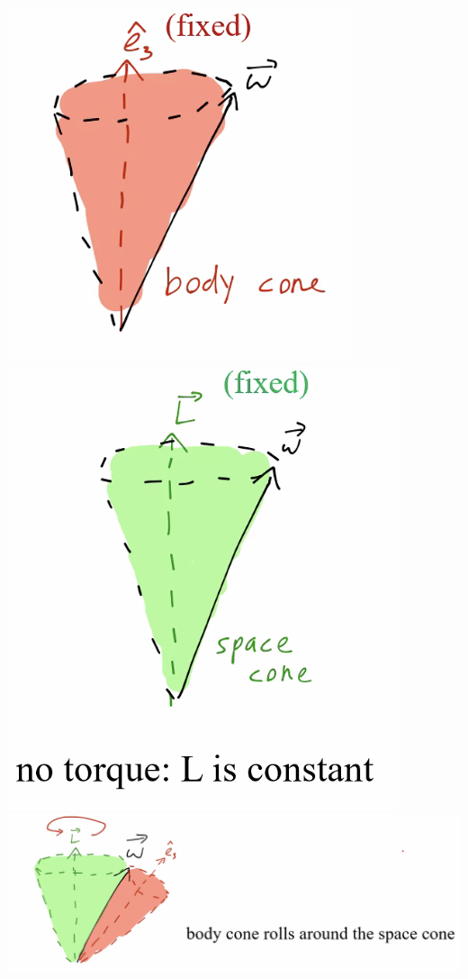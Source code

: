 \documentclass[../PHYS306Notes.tex]{subfiles}
\begin{document}
\begin{center}
    \includegraphics[scale=0.5]{Lecture-20/l20-img4.png}
    \includegraphics[scale=0.5]{Lecture-20/l20-img5.png}
    \includegraphics[scale=0.5]{Lecture-20/l20-img6.png}
\end{center}
\end{document}

